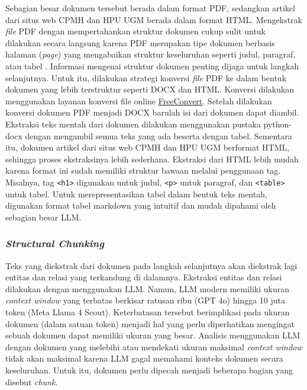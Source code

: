 Sebagian besar dokumen tersebut berada dalam format PDF, sedangkan artikel dari situs web CPMH dan HPU UGM berada dalam format HTML.
Mengekstrak \textit{file} PDF dengan mempertahankan struktur dokumen cukup sulit untuk dilakukan secara langsung karena PDF merupakan tipe dokumen berbasis halaman (\textit{page}) yang mengabaikan struktur keseluruhan seperti judul, paragraf, atau tabel \cite{mohemad2011automaticPDFStructExtract}.
Informasi mengenai struktur dokumen penting dijaga untuk langkah selanjutnya.
Untuk itu, dilakukan strategi konversi \textit{file} PDF ke dalam bentuk dokumen yang lebih terstruktur seperti DOCX dan HTML.
Konversi dilakukan menggunakan layanan konversi file online \href{https://www.freeconvert.com/}{FreeConvert}.
Setelah dilakukan konversi dokumen PDF menjadi DOCX barulah isi dari dokumen dapat diambil.
Ekstraksi teks mentah dari dokumen dilakukan menggunakan pustaka python-docx dengan mengambil semua teks yang ada beserta dengan tabel.
Sementara itu, dokumen artikel dari situs web CPMH dan HPU UGM berformat HTML, sehingga proses ekstraksinya lebih sederhana.
Ekstraksi dari HTML lebih mudah karena format ini sudah memiliki struktur bawaan melalui penggunaan tag.
Misalnya, tag \texttt{<h1>} digunakan untuk judul, \texttt{<p>} untuk paragraf, dan \texttt{<table>} untuk tabel.
Untuk merepresentasikan tabel dalam bentuk teks mentah, digunakan format tabel markdown yang intuitif dan mudah dipahami oleh sebagian besar LLM.

\subsubsection{\textit{Structural Chunking}}
Teks yang diekstrak dari dokumen pada langkah selanjutnya akan diekstrak lagi entitas dan relasi yang terkandung di dalamnya.
Ekstraksi entitas dan relasi dilakukan dengan menggunakan LLM.
Namun, LLM modern memiliki ukuran \textit{context window} yang terbatas berkisar ratusan ribu (GPT 4o) hingga 10 juta token (Meta Llama 4 Scout).
Keterbatasan tersebut berimplikasi pada ukuran dokumen (dalam satuan token) menjadi hal yang perlu diperhatikan mengingat sebuah dokumen dapat memiliki ukuran yang besar.
Analisis menggunakan LLM dengan dokumen yang melebihi atau mendekati ukuran maksimal \textit{context window} tidak akan maksimal karena LLM gagal memahami konteks dokumen secara keseluruhan.
Untuk itu, dokumen perlu dipecah menjadi beberapa bagian yang disebut \textit{chunk}.

